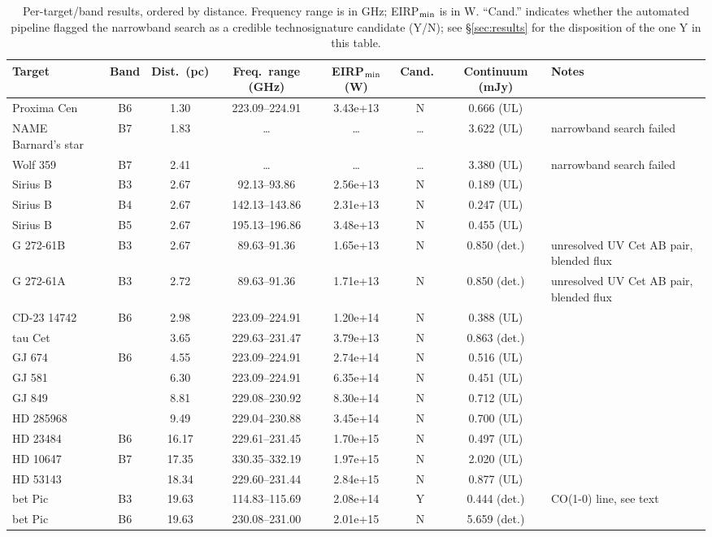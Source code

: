 \documentclass{openjournal}
\begin{document}
\begin{table}
\centering
\footnotesize
\caption{Per-target/band results, ordered by distance. Frequency range is
in GHz; EIRP$_{\rm min}$ is in W. ``Cand.'' indicates whether the
automated pipeline flagged the narrowband search as a credible
technosignature candidate (Y/N); see \S\ref{sec:results} for the
disposition of the one Y in this table.}
\label{tab:full}
\begin{tabularx}{\textwidth}{@{}l c c c c c c X@{}}
\hline
Target & Band & Dist.\ (pc) & Freq.\ range (GHz) & EIRP$_{\rm min}$ (W) & Cand.\ & Continuum (mJy) & Notes \\
\hline
Proxima Cen & B6 & 1.30 & 223.09--224.91 & 3.43e+13 & N & 0.666 (UL) &  \\
NAME Barnard's star & B7 & 1.83 & \ldots & \ldots & \ldots & 3.622 (UL) & narrowband search failed \\
Wolf  359 & B7 & 2.41 & \ldots & \ldots & \ldots & 3.380 (UL) & narrowband search failed \\
Sirius B & B3 & 2.67 & 92.13--93.86 & 2.56e+13 & N & 0.189 (UL) &  \\
Sirius B & B4 & 2.67 & 142.13--143.86 & 2.31e+13 & N & 0.247 (UL) &  \\
Sirius B & B5 & 2.67 & 195.13--196.86 & 3.48e+13 & N & 0.455 (UL) &  \\
G 272-61B & B3 & 2.67 & 89.63--91.36 & 1.65e+13 & N & 0.850 (det.) & unresolved UV Cet AB pair, blended flux \\
G 272-61A & B3 & 2.72 & 89.63--91.36 & 1.71e+13 & N & 0.850 (det.) & unresolved UV Cet AB pair, blended flux \\
CD-23 14742 & B6 & 2.98 & 223.09--224.91 & 1.20e+14 & N & 0.388 (UL) &  \\
tau Cet &  & 3.65 & 229.63--231.47 & 3.79e+13 & N & 0.863 (det.) &  \\
GJ 674 & B6 & 4.55 & 223.09--224.91 & 2.74e+14 & N & 0.516 (UL) &  \\
GJ 581 &  & 6.30 & 223.09--224.91 & 6.35e+14 & N & 0.451 (UL) &  \\
GJ 849 &  & 8.81 & 229.08--230.92 & 8.30e+14 & N & 0.712 (UL) &  \\
HD 285968 &  & 9.49 & 229.04--230.88 & 3.45e+14 & N & 0.700 (UL) &  \\
HD 23484 & B6 & 16.17 & 229.61--231.45 & 1.70e+15 & N & 0.497 (UL) &  \\
HD 10647 & B7 & 17.35 & 330.35--332.19 & 1.97e+15 & N & 2.020 (UL) &  \\
HD 53143 &  & 18.34 & 229.60--231.44 & 2.84e+15 & N & 0.877 (UL) &  \\
bet Pic & B3 & 19.63 & 114.83--115.69 & 2.08e+14 & Y & 0.444 (det.) & CO(1-0) line, see text \\
bet Pic & B6 & 19.63 & 230.08--231.00 & 2.01e+15 & N & 5.659 (det.) &  \\
\hline
\end{tabularx}
\end{table}
\end{document}
